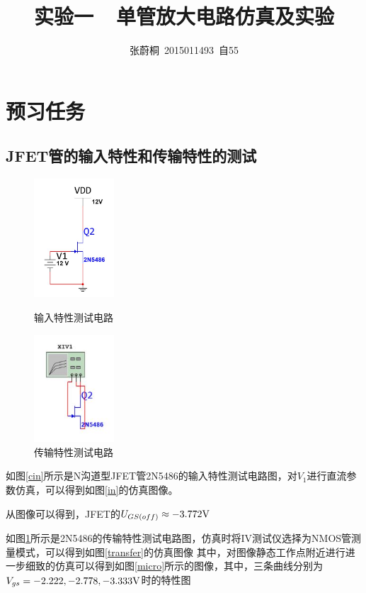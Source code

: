 \documentclass[UTF8,a4paper]{ctexart}
\title{实验一\ \ 单管放大电路仿真及实验}
\author{张蔚桐\ 2015011493\ 自55}
\begin{document}
\maketitle
\section{预习任务}
\subsection{JFET管的输入特性和传输特性的测试}
\begin{figure}
\includegraphics [width=30mm]{in.jpg}
\caption{输入特性测试电路}
\label{cin}
\includegraphics [width = 30mm]{transfer.jpg}
\caption{传输特性测试电路}
\label{ctransfer}
\end{figure}
如图\ref{cin}所示是N沟道型JFET管2N5486的输入特性测试电路图，对$V_1$进行直流参数仿真，可以得到如图\ref{in}的仿真图像。

从图像可以得到，JFET的$U_{GS(off)}\approx-3.772\rm{V}$

如图\ref{ctransfer}所示是2N5486的传输特性测试电路图，仿真时将IV测试仪选择为NMOS管测量模式，可以得到如图\ref{transfer}的仿真图像
其中，对图像静态工作点附近进行进一步细致的仿真可以得到如图\ref{micro}所示的图像，其中，三条曲线分别为$V_{gs}=-2.222,-2.778,-3.333\rm{V}$时的特性图
\end{document}
